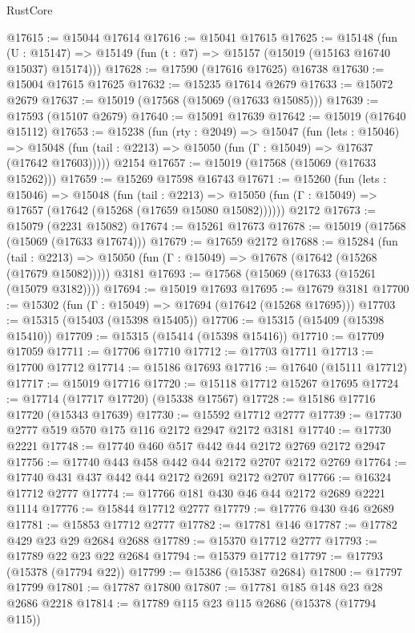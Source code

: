 \begin{lexlean}{RustCore}
\begin{coremodule}
@17615 := @15044 @17614
@17616 := @15041 @17615
@17625 := @15148
    (fun (U : @15147) => @15149 (fun (t : @7) => @15157 (@15019 (@15163 @16740 @15037) @15174)))
@17628 := @17590 (@17616 @17625) @16738
@17630 := @15004 @17615 @17625
@17632 := @15235 @17614 @2679
@17633 := @15072 @2679
@17637 := @15019 (@17568 (@15069 (@17633 @15085)))
@17639 := @17593 (@15107 @2679)
@17640 := @15091 @17639
@17642 := @15019 (@17640 @15112)
@17653 := @15238
    (fun (rty : @2049) =>
    @15047
      (fun (lets : @15046) =>
      @15048 (fun (tail : @2213) => @15050 (fun (Γ : @15049) => @17637 (@17642 @17603)))))
    @2154
@17657 := @15019 (@17568 (@15069 (@17633 @15262)))
@17659 := @15269 @17598 @16743
@17671 := @15260
    (fun (lets : @15046) =>
    @15048
      (fun (tail : @2213) =>
      @15050 (fun (Γ : @15049) => @17657 (@17642 (@15268 (@17659 @15080 @15082))))))
    @2172
@17673 := @15079 (@2231 @15082)
@17674 := @15261 @17673
@17678 := @15019 (@17568 (@15069 (@17633 @17674)))
@17679 := @17659 @2172
@17688 := @15284
    (fun (tail : @2213) => @15050 (fun (Γ : @15049) => @17678 (@17642 (@15268 (@17679 @15082)))))
    @3181
@17693 := @17568 (@15069 (@17633 (@15261 (@15079 @3182))))
@17694 := @15019 @17693
@17695 := @17679 @3181
@17700 := @15302 (fun (Γ : @15049) => @17694 (@17642 (@15268 @17695)))
@17703 := @15315 (@15403 (@15398 @15405))
@17706 := @15315 (@15409 (@15398 @15410))
@17709 := @15315 (@15414 (@15398 @15416))
@17710 := @17709 @17059
@17711 := @17706 @17710
@17712 := @17703 @17711
@17713 := @17700 @17712
@17714 := @15186 @17693
@17716 := @17640 (@15111 @17712)
@17717 := @15019 @17716
@17720 := @15118 @17712 @15267 @17695
@17724 := @17714 (@17717 @17720) (@15338 @17567)
@17728 := @15186 @17716 @17720 (@15343 @17639)
@17730 := @15592 @17712 @2777
@17739 := @17730 @2777 @519 @570 @175 @116 @2172 @2947 @2172 @3181
@17740 := @17730 @2221
@17748 := @17740 @460 @517 @442 @44 @2172 @2769 @2172 @2947
@17756 := @17740 @443 @458 @442 @44 @2172 @2707 @2172 @2769
@17764 := @17740 @431 @437 @442 @44 @2172 @2691 @2172 @2707
@17766 := @16324 @17712 @2777
@17774 := @17766 @181 @430 @46 @44 @2172 @2689 @2221 @1114
@17776 := @15844 @17712 @2777
@17779 := @17776 @430 @46 @2689
@17781 := @15853 @17712 @2777
@17782 := @17781 @146
@17787 := @17782 @429 @23 @29 @2684 @2688
@17789 := @15370 @17712 @2777
@17793 := @17789 @22 @23 @22 @2684
@17794 := @15379 @17712
@17797 := @17793 (@15378 (@17794 @22))
@17799 := @15386 (@15387 @2684)
@17800 := @17797 @17799
@17801 := @17787 @17800
@17807 := @17781 @185 @148 @23 @28 @2686 @2218
@17814 := @17789 @115 @23 @115 @2686 (@15378 (@17794 @115))

\end{coremodule}
\end{lexlean}
